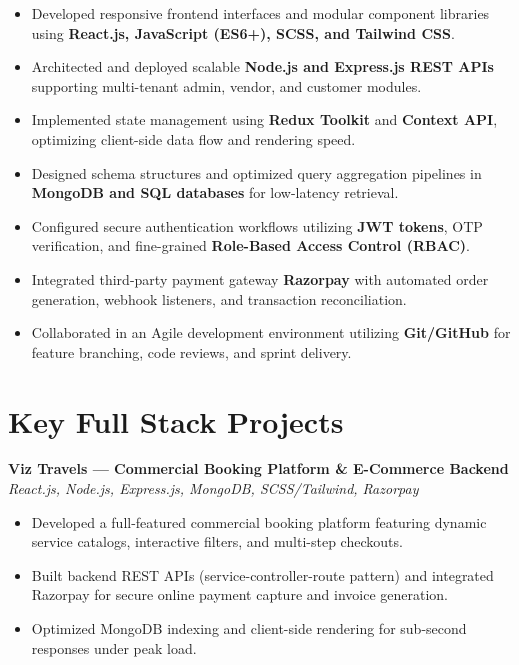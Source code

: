 \documentclass[a4paper,10pt]{article}
\begin{document}
\begin{itemize}

    \item Developed responsive frontend interfaces and modular component libraries using \textbf{React.js, JavaScript (ES6+), SCSS, and Tailwind CSS}.

    \item Architected and deployed scalable \textbf{Node.js and Express.js REST APIs} supporting multi-tenant admin, vendor, and customer modules.

    \item Implemented state management using \textbf{Redux Toolkit} and \textbf{Context API}, optimizing client-side data flow and rendering speed.

    \item Designed schema structures and optimized query aggregation pipelines in \textbf{MongoDB and SQL databases} for low-latency retrieval.

    \item Configured secure authentication workflows utilizing \textbf{JWT tokens}, OTP verification, and fine-grained \textbf{Role-Based Access Control (RBAC)}.

    \item Integrated third-party payment gateway \textbf{Razorpay} with automated order generation, webhook listeners, and transaction reconciliation.

    \item Collaborated in an Agile development environment utilizing \textbf{Git/GitHub} for feature branching, code reviews, and sprint delivery.

\end{itemize}

\section*{Key Full Stack Projects}

\textbf{Viz Travels --- Commercial Booking Platform \& E-Commerce Backend}
\hfill
\textit{React.js, Node.js, Express.js, MongoDB, SCSS/Tailwind, Razorpay}

\begin{itemize}

    \item Developed a full-featured commercial booking platform featuring dynamic service catalogs, interactive filters, and multi-step checkouts.

    \item Built backend REST APIs (service-controller-route pattern) and integrated Razorpay for secure online payment capture and invoice generation.

    \item Optimized MongoDB indexing and client-side rendering for sub-second responses under peak load.

\end{itemize}
\end{document}
